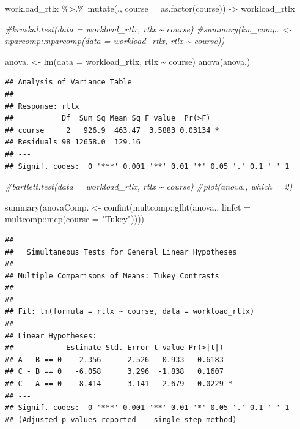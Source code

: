 \documentclass[
]{article}
\newenvironment{Shaded}{\begin{snugshade}}{\end{snugshade}}
\newcommand{\AttributeTok}[1]{\textcolor[rgb]{0.77,0.63,0.00}{#1}}
\newcommand{\CommentTok}[1]{\textcolor[rgb]{0.56,0.35,0.01}{\textit{#1}}}
\newcommand{\FunctionTok}[1]{\textcolor[rgb]{0.00,0.00,0.00}{#1}}
\newcommand{\NormalTok}[1]{#1}
\newcommand{\OtherTok}[1]{\textcolor[rgb]{0.56,0.35,0.01}{#1}}
\newcommand{\SpecialCharTok}[1]{\textcolor[rgb]{0.00,0.00,0.00}{#1}}
\newcommand{\StringTok}[1]{\textcolor[rgb]{0.31,0.60,0.02}{#1}}
\begin{document}
\begin{Shaded}
\begin{Highlighting}[]
\NormalTok{workload\_rtlx }\SpecialCharTok{\%\textgreater{}.\%}
  \FunctionTok{mutate}\NormalTok{(., }\AttributeTok{course =} \FunctionTok{as.factor}\NormalTok{(course)) }\OtherTok{{-}\textgreater{}}\NormalTok{ workload\_rtlx}

\CommentTok{\#kruskal.test(data = workload\_rtlx, rtlx \textasciitilde{} course)}
\CommentTok{\#summary(kw\_comp. \textless{}{-} nparcomp::nparcomp(data = workload\_rtlx, rtlx \textasciitilde{} course))}

\NormalTok{anova. }\OtherTok{\textless{}{-}} \FunctionTok{lm}\NormalTok{(}\AttributeTok{data =}\NormalTok{ workload\_rtlx, rtlx }\SpecialCharTok{\textasciitilde{}}\NormalTok{ course)}
\FunctionTok{anova}\NormalTok{(anova.)}
\end{Highlighting}
\end{Shaded}

\begin{verbatim}
## Analysis of Variance Table
## 
## Response: rtlx
##           Df  Sum Sq Mean Sq F value  Pr(>F)  
## course     2   926.9  463.47  3.5883 0.03134 *
## Residuals 98 12658.0  129.16                  
## ---
## Signif. codes:  0 '***' 0.001 '**' 0.01 '*' 0.05 '.' 0.1 ' ' 1
\end{verbatim}

\begin{Shaded}
\begin{Highlighting}[]
\CommentTok{\#bartlett.test(data = workload\_rtlx, rtlx \textasciitilde{} course)}
\CommentTok{\#plot(anova., which = 2)}

\FunctionTok{summary}\NormalTok{(anovaComp. }\OtherTok{\textless{}{-}} \FunctionTok{confint}\NormalTok{(multcomp}\SpecialCharTok{::}\FunctionTok{glht}\NormalTok{(anova.,}
  \AttributeTok{linfct =}\NormalTok{ multcomp}\SpecialCharTok{::}\FunctionTok{mcp}\NormalTok{(}\AttributeTok{course =} \StringTok{"Tukey"}\NormalTok{))))}
\end{Highlighting}
\end{Shaded}

\begin{verbatim}
## 
##   Simultaneous Tests for General Linear Hypotheses
## 
## Multiple Comparisons of Means: Tukey Contrasts
## 
## 
## Fit: lm(formula = rtlx ~ course, data = workload_rtlx)
## 
## Linear Hypotheses:
##            Estimate Std. Error t value Pr(>|t|)  
## A - B == 0    2.356      2.526   0.933   0.6183  
## C - B == 0   -6.058      3.296  -1.838   0.1607  
## C - A == 0   -8.414      3.141  -2.679   0.0229 *
## ---
## Signif. codes:  0 '***' 0.001 '**' 0.01 '*' 0.05 '.' 0.1 ' ' 1
## (Adjusted p values reported -- single-step method)
\end{verbatim}
\end{document}
